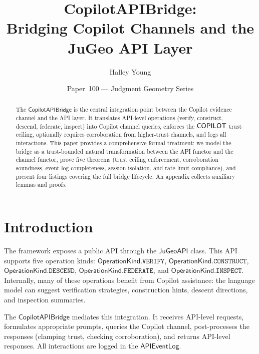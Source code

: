 \documentclass[11pt]{article}
\title{\textbf{CopilotAPIBridge:\\
Bridging Copilot Channels and the JuGeo API Layer}}
\author{Halley Young}
\date{Paper~100 --- Judgment Geometry Series}
\newcommand{\Bridge}{\mathsf{CopilotAPIBridge}}
\newcommand{\JuGeoAPI}{\mathsf{JuGeoAPI}}
\newcommand{\APILog}{\mathsf{APIEventLog}}
\newcommand{\OpKind}{\mathsf{OperationKind}}
\begin{document}
\maketitle

\begin{abstract}
The $\Bridge$ is the central integration point between the
Copilot evidence channel and the \JuGeo{} API layer.  It
translates API-level operations (verify, construct, descend,
federate, inspect) into Copilot channel queries, enforces
the $\mathsf{COPILOT}$ trust ceiling, optionally requires
corroboration from higher-trust channels, and logs all
interactions.  This paper provides a comprehensive formal
treatment: we model the bridge as a trust-bounded natural
transformation between the API functor and the channel
functor, prove five theorems (trust ceiling enforcement,
corroboration soundness, event log completeness, session
isolation, and rate-limit compliance), and present four
\Python{} listings covering the full bridge lifecycle.
An appendix collects auxiliary lemmas and proofs.
\end{abstract}

\section{Introduction}\label{sec:intro}

The \JuGeo{} framework exposes a public API through the
$\JuGeoAPI$ class.  This API supports five operation kinds:
$\OpKind.\texttt{VERIFY}$, $\OpKind.\texttt{CONSTRUCT}$,
$\OpKind.\texttt{DESCEND}$, $\OpKind.\texttt{FEDERATE}$,
and $\OpKind.\texttt{INSPECT}$.  Internally, many of these
operations benefit from Copilot assistance: the language
model can suggest verification strategies, construction
hints, descent directions, and inspection summaries.

The $\Bridge$ mediates this integration.  It receives
API-level requests, formulates appropriate prompts, queries
the Copilot channel, post-processes the responses (clamping
trust, checking corroboration), and returns API-level
responses.  All interactions are logged in the $\APILog$.
\end{document}
